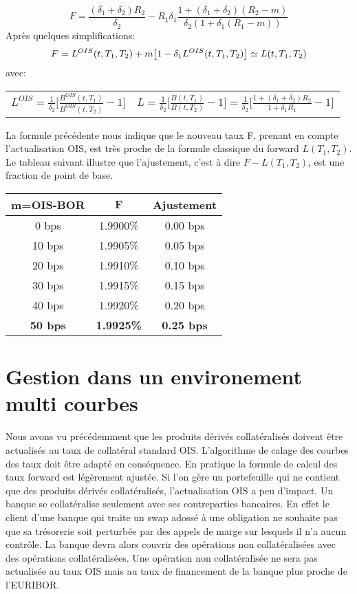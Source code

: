 \documentclass{article}
\begin{document}
\[
F=\frac{(\delta_1+\delta_2) R_2}{\delta_2}-R_1 \delta_1 \frac{1+(\delta_1+\delta_2) (R_2-m)}{\delta_2 (1+\delta_1 (R_1-m))}
\]
Après quelques simplifications:\\
\[
F=L^{OIS}(t,T_1,T_2)+m \big[ 1 - \delta_1 L^{OIS}(t,T_1,T_2) \big] \simeq L(t,T_1,T_2) \\
\]
avec:\\
\begin{center}
\begin{tabular}{c c}
$L^{OIS}=\frac{1}{\delta_2}\big[ \frac{B^{OIS}(t,T_1)}{B^{OIS}(t,T_2)}-1 \big]$&
$L=\frac{1}{\delta_2}\big[ \frac{B(t,T_1)}{B(t,T_2)}-1 \big]=\frac{1}{\delta_2}\big[\frac{1+(\delta_1+\delta_2) R_2}{1+\delta_1 R_1}-1\big]$\\
\end{tabular}
\end{center}
La formule précédente nous indique que le nouveau taux F, prenant en compte l'actualisation OIS, est très proche de la formule classique du forward $L(T_1,T_2)$. Le tableau suivant illustre que l'ajustement, c'est à dire $F-L(T_1,T_2)$, est une fraction de point de base.
\begin{center}
\begin{tabular}{|c|c|c|}  
\hline  
\textbf{m=OIS-BOR} & $\textbf{F}$ & \textbf{Ajustement} \\ 
\hline  
0 bps & 1.9900\%&0.00 bps\\ 
10 bps & 1.9905\%&0.05 bps\\ 
20 bps & 1.9910\%&0.10 bps\\ 
30 bps & 1.9915\%&0.15 bps\\ 
40 bps & 1.9920\%&0.20 bps\\ 
\textbf{\color{red}50 bps} & \textbf{\color{red}1.9925\%}&\textbf{\color{red}0.25 bps}\\ 
\hline 
\end{tabular}
\end{center}
\section*{Gestion dans un environement multi courbes}

Nous avons vu précédemment que les produits dérivés collatéralisés doivent être actualisés au taux de collatéral standard OIS. L'algorithme de calage des courbes des taux doit être adapté en conséquence. En pratique la formule de calcul des taux forward est légèrement ajustée. Si l'on gère un portefeuille qui ne contient que des produits dérivés collatéralisés, l'actualisation OIS a peu d'impact. Un banque se collatéralise seulement avec ses contreparties bancaires. En effet le client d'une banque qui traite un swap adossé à une obligation ne souhaite pas que sa trésorerie soit perturbée par des appels de marge sur lesquels il n'a aucun contrôle. La banque devra alors couvrir des opérations non collatéralisées avec des opérations collatéralisées. Une opération non collatéralisée ne sera pas actualisée au taux OIS mais au taux de financement de la banque plus proche de l'EURIBOR.\\
\end{document}
